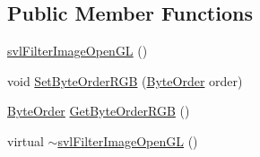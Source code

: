 \subsection*{Public Member Functions}
\begin{DoxyCompactItemize}
\item 
\hyperlink{classsvl_filter_image_open_g_l_a8b772ba681346f079117e661f26551b7}{svl\+Filter\+Image\+Open\+G\+L} ()
\item 
void \hyperlink{classsvl_filter_image_open_g_l_aa16192e2c1aa0064d7e11494e3036b57}{Set\+Byte\+Order\+R\+G\+B} (\hyperlink{classsvl_filter_image_open_g_l_aebab8852e9b2fd8bc2fb69c7ce788d3f}{Byte\+Order} order)
\item 
\hyperlink{classsvl_filter_image_open_g_l_aebab8852e9b2fd8bc2fb69c7ce788d3f}{Byte\+Order} \hyperlink{classsvl_filter_image_open_g_l_a4daa667fb422ccd3ce8bcc77055fe3f7}{Get\+Byte\+Order\+R\+G\+B} ()
\item 
virtual \hyperlink{classsvl_filter_image_open_g_l_aa0189005553588af884ee62ab9aa3c74}{$\sim$svl\+Filter\+Image\+Open\+G\+L} ()
\end{DoxyCompactItemize}
